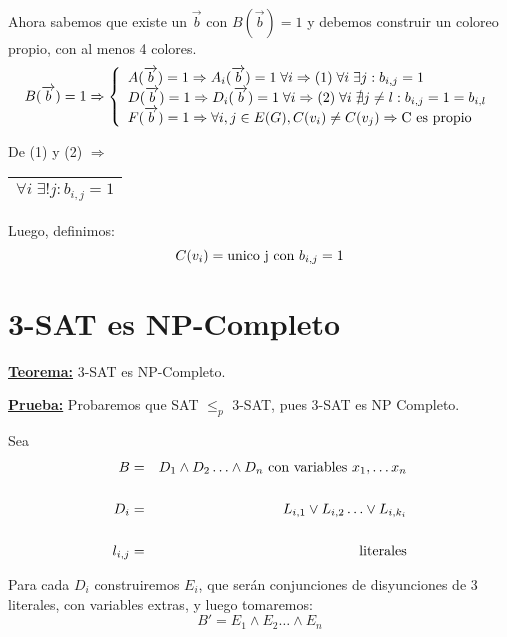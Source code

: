 \documentclass[12pt,a4paper]{report}
\newcounter{neq}
\begin{document}
				\par Ahora sabemos que existe un $\overrightarrow{b}$ con $B(\overrightarrow{b}) = 1$ y debemos construir un coloreo propio, con al menos 4 colores.
				\begin{equation*}
					B(\overrightarrow{b}) = 1\Rightarrow
		  			\left \lbrace
		  			\begin{array}{l}
		    		 A(\overrightarrow{b}) = 1 \Rightarrow A_{i}(\overrightarrow{b}) = 1 \; \forall i \Rightarrow  (1) \; \forall i \; \exists j : b_{i, j}  = 1 \\
		     		 D(\overrightarrow{b}) = 1 \Rightarrow D_{i}(\overrightarrow{b}) = 1 \; \forall i \Rightarrow  (2) \;  \forall i \; \nexists j \neq l : b_{i, j}  = 1 = b_{i, l} \\
		     		 F(\overrightarrow{b}) = 1 \Rightarrow \forall i, j \in E(G), C(v_{i}) \neq C(v_{j}) \Rightarrow \textup{C es propio}
		  			\end{array}
		  			\right.
				\end{equation*}
				\par De (1) y (2) $\Rightarrow$ \begin{tabular}{|c|} \hline $\forall i \; \exists ! j : b_{i, j} = 1$ \\ \hline \end{tabular}

				\vspace{3mm}
				\par Luego, definimos:
				\[ C(v_{i}) = \textup{unico j con } b_{i, j} = 1\]


	\section{3-SAT es NP-Completo}
		\textbf{\underline{Teorema:}} 3-SAT es NP-Completo.

		\textbf{\underline{Prueba:}} Probaremos que SAT $\leq_{p}$ 3-SAT, pues 3-SAT es NP Completo.

		\vspace{3mm}
		\par Sea
		\begin{eqnarray}
			B &=& D_{1} \wedge D_{2} \dotsc \wedge D_{n} \textup{ con variables } x_{1}, \dotsc x_{n} \\
			\nonumber \\
			D_{i} &=& L_{i, 1} \vee L_{i, 2} \dotsc \vee L_{i, k_{i}} \\
			\nonumber \\
			l_{i, j} &=& \textup{literales}
		\end{eqnarray}
		\par Para cada $D_{i}$ construiremos $E_{i}$, que serán conjunciones de disyunciones de 3 literales, con variables extras, y luego tomaremos:
		\[ B' = E_{1} \wedge E_{2} \dotsc \wedge E_{n} \]
\end{document}
